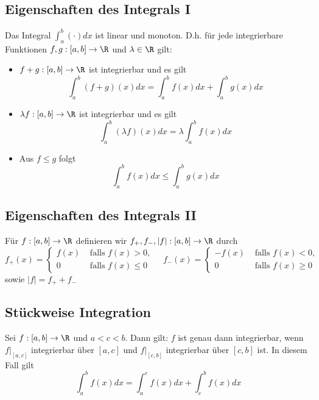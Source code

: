 	\subsection{Eigenschaften des Integrals I}
		\begin{Satz} [ ]
			Das Integral $\displaystyle\int_a^b(\cdot)dx$ ist linear und monoton. D.h. für jede integrierbare Funktionen $f, g:[a, b]\to\R$ und $\lambda\in\R$ gilt:
			\begin{itemize}
				\item $f+g:[a, b]\to\R$ ist integrierbar und es gilt
					$$
						\int_a^b(f+g)(x)dx=\int_a^bf(x)dx+\int_a^bg(x)dx
					$$
				\item $\lambda f:[a, b]\to\R$ ist integrierbar und es gilt
					$$
						\int_a^b(\lambda f)(x)dx=\lambda\int_a^bf(x)dx
					$$
				\item Aus $f\leq g$ folgt
					$$
						\int_a^bf(x)dx\leq\int_a^bg(x)dx
					$$
			\end{itemize}
		\end{Satz}
	\subsection{Eigenschaften des Integrals II}
		\begin{Definition} [ $f_+, f_-,|f|$]
			Für $f:[a, b]\to\R$ definieren wir $f_+, f_-, |f|:[a, b]\to\R$ durch
			$$
				f_+(x)=\begin{cases}
					f(x) & \text{ falls } f(x)>0, \\
					0 & \text{ falls } f(x)\leq0
				\end{cases} \quad
				f_-(x)=\begin{cases}
					-f(x) & \text{ falls } f(x)<0, \\
					0 & \text{ falls } f(x) \geq 0
				\end{cases}
			$$
			sowie $|f|=f_++f_-$
		\end{Definition}
	\subsection{Stückweise Integration} 
		\begin{Satz} [ ]
			Sei $f:[a, b]\to\R$ und $a<c<b$. Dann gilt: $f$ ist genau dann integrierbar, wenn $f|_{[a, c]}$ integrierbar über $[a, c]$ und $f|_[c, b]$ integrierbar über $[c, b]$ ist. \newline
			In diesem Fall gilt
			$$
				\int_a^bf(x)dx=\int_a^cf(x)dx+\int_c^bf(x)dx
			$$
		\end{Satz}
